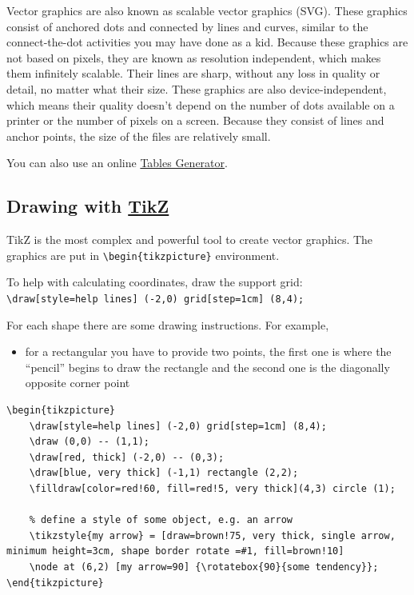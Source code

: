\documentclass[a4paper,11pt]{article}
\begin{document}
Vector graphics are also known as scalable vector graphics (SVG). These graphics consist of anchored dots and connected by lines and curves, similar to the connect-the-dot activities you may have done as a kid. Because these graphics are not based on pixels, they are known as resolution independent, which makes them infinitely scalable. Their lines are sharp, without any loss in quality or detail, no matter what their size. These graphics are also device-independent, which means their quality doesn't depend on the number of dots available on a printer or the number of pixels on a screen. Because they consist of lines and anchor points, the size of the files are relatively small.

You can also use an online \href{https://www.tablesgenerator.com/}{Tables Generator}.

\subsection{Drawing with \href{https://www.overleaf.com/learn/latex/TikZ_package}{TikZ}}

TikZ is the most complex and powerful tool to create vector graphics.
The graphics are put in \verb|\begin{tikzpicture}| environment.

\medskip

To help with calculating coordinates, draw the support grid: \\ \verb|\draw[style=help lines] (-2,0) grid[step=1cm] (8,4);|

\medskip

For each shape there are some drawing instructions. 
For example, 
\begin{itemize}
	\item for a rectangular you have to provide two points, the first one is where the ``pencil'' begins to draw the rectangle and the second one is the diagonally opposite corner point
\end{itemize}

\begin{lstlisting}
\begin{tikzpicture}
	\draw[style=help lines] (-2,0) grid[step=1cm] (8,4);
	\draw (0,0) -- (1,1);
	\draw[red, thick] (-2,0) -- (0,3);
	\draw[blue, very thick] (-1,1) rectangle (2,2);
	\filldraw[color=red!60, fill=red!5, very thick](4,3) circle (1);
	
	% define a style of some object, e.g. an arrow
	\tikzstyle{my arrow} = [draw=brown!75, very thick, single arrow, minimum height=3cm, shape border rotate =#1, fill=brown!10]
	\node at (6,2) [my arrow=90] {\rotatebox{90}{some tendency}};
\end{tikzpicture}
\end{lstlisting}
\end{document}
